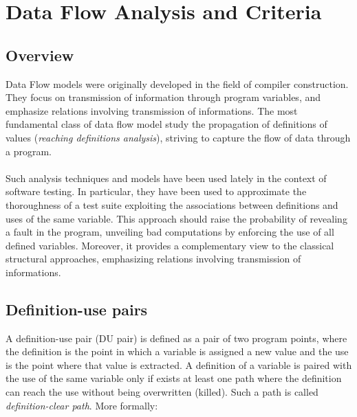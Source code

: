 \section{Data Flow Analysis and Criteria}\label{related}

\subsection{Overview}

Data Flow models  were originally developed in the field of compiler
construction. They focus on transmission of information through program variables, and emphasize 
relations involving transmission of informations. The most fundamental class of data flow model
study the propagation of definitions of values (\textit{reaching definitions analysis}), striving to capture the flow of data through a program. 

\paragraph{}
Such analysis techniques and models have been used lately in the context of software testing. In particular, they 
have been used to approximate the thoroughness of a test suite exploiting the associations between definitions and uses of the same variable. This approach should raise the probability of revealing a fault in the program, unveiling bad computations by enforcing the use of all defined variables. Moreover, it provides a complementary view to the classical structural approaches, emphasizing relations involving transmission of informations. 


\subsection{Definition-use pairs}
A definition-use pair (DU pair) is defined as a pair of two program points, where the definition is the point in which a variable is assigned a
new value and the use is the point where that value is extracted. A definition of a variable is paired with the use of the same variable only if exists at least one path where the definition can reach the use without being overwritten (killed). Such a path is called \textit{definition-clear path}. More formally: \vspace{2mm}

